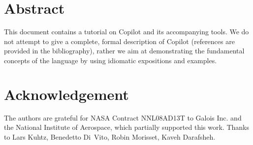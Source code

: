 \documentclass[12pt]{article}
\theoremstyle{example}
\begin{document}
\vspace{0.25cm}

\section*{Abstract}

{
\small
This document contains a tutorial on Copilot and its accompanying tools.
We do not attempt to give a complete, formal description of Copilot
(references are provided in the bibliography), rather we aim at
demonstrating the fundamental concepts of the language by using idiomatic
expositions and examples.
}
\newpage
{
\small
\setcounter{tocdepth}{2}
\tableofcontents
}

\newpage
{}
\section*{Acknowledgement}

The authors are grateful for NASA Contract NNL08AD13T to Galois Inc. and the
National Institute of Aerospace, which partially supported this work.
Thanks to Lars Kuhtz, Benedetto Di~Vito,  Robin Morisset, Kaveh
Darafsheh.

{









}
\end{document}
